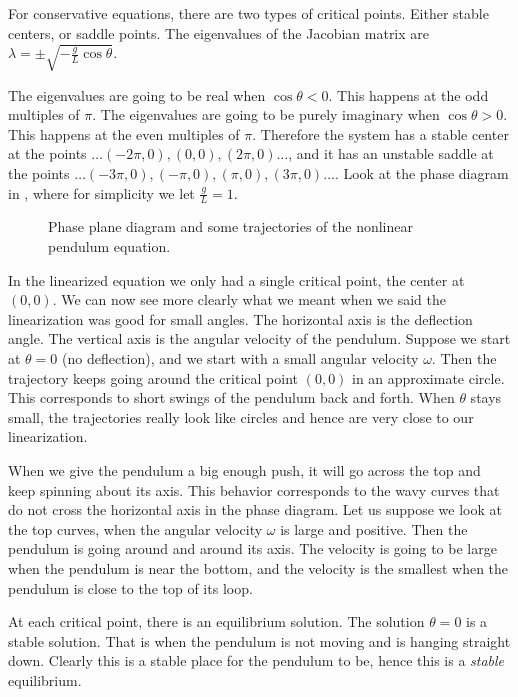 For conservative equations, there are two types of
critical points.  Either stable centers, or saddle points.  The eigenvalues
of the Jacobian matrix are $\lambda = \pm \sqrt{-\frac{g}{L}\cos \theta}$.

The
eigenvalues are going to be real when $\cos \theta < 0$.  This happens at the odd multiples of $\pi$.
The
eigenvalues are going to be purely imaginary 
when $\cos \theta > 0$.  This happens at the even
multiples of $\pi$.  Therefore the system has a stable center at
the points $\ldots (-2\pi,0), (0,0), (2\pi,0) \ldots$, and it has an
unstable saddle at
the points $\ldots (-3\pi,0), (-\pi,0), (\pi,0), (3\pi,0) \ldots$.  Look at the
phase diagram in ,
where for simplicity we let $\frac{g}{L} = 1$.

\begin{figure}[h!t]
\capstart
\begin{center}
\caption{Phase plane diagram and some trajectories of
the nonlinear pendulum equation. \label{fig:nlin-pend-phasediag}}
\end{center}
\end{figure}

In the linearized equation we only had a single critical point, the center
at $(0,0)$.  We can now see more clearly what we meant when we said the
linearization was good for small angles.  The horizontal axis is the
deflection angle.  The vertical axis is the angular velocity of the
pendulum.  Suppose we start at $\theta = 0$ (no deflection), and
we start with a small angular velocity $\omega$.  Then the trajectory keeps going
around the critical point $(0,0)$ in an approximate circle.  This
corresponds to short swings of the pendulum back and forth.  When $\theta$
stays small, the trajectories really look like circles and hence are very
close to our linearization.

When we give the pendulum a big enough push, it will
go across the top and keep spinning about its axis.  This behavior
corresponds to the
wavy curves that do not cross the horizontal axis in the phase diagram.
Let us suppose we look at the top curves, when the angular velocity $\omega$
is large and positive.  Then the pendulum is going
around and around its axis.  The velocity is going to
be large when the pendulum is near the bottom, and the velocity is the
smallest when the pendulum
is close to the top of its loop.

At each critical point, there is an equilibrium solution.  The solution
$\theta = 0$ is a stable solution.  That is when the pendulum is not moving
and is hanging straight down.  Clearly this is a stable place for the
pendulum to be, hence this is a \emph{stable} equilibrium.

